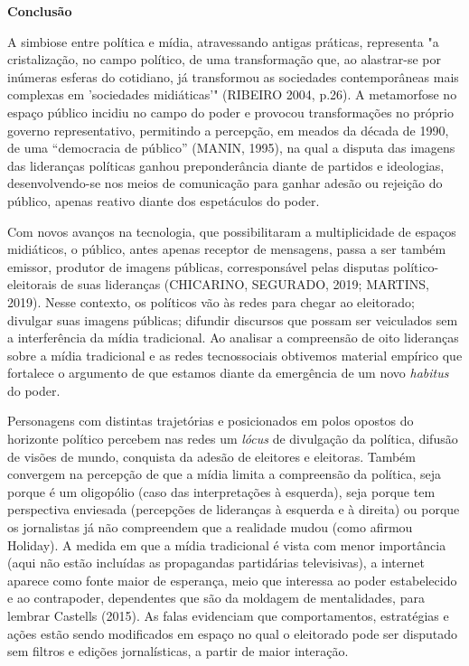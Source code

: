 \textbf{Conclusão}

A simbiose entre política e mídia, atravessando antigas práticas,
representa "a cristalização, no campo político, de uma transformação
que, ao alastrar-se por inúmeras esferas do cotidiano, já transformou as
sociedades contemporâneas mais complexas em 'sociedades midiáticas'"
(RIBEIRO 2004, p.26). A metamorfose no espaço público incidiu no campo
do poder e provocou transformações no próprio governo representativo,
permitindo a percepção, em meados da década de 1990, de uma ``democracia
de público'' (MANIN, 1995), na qual a disputa das imagens das lideranças
políticas ganhou preponderância diante de partidos e ideologias,
desenvolvendo-se nos meios de comunicação para ganhar adesão ou rejeição
do público, apenas reativo diante dos espetáculos do poder.

Com novos avanços na tecnologia, que possibilitaram a multiplicidade de
espaços midiáticos, o público, antes apenas receptor de mensagens, passa
a ser também emissor, produtor de imagens públicas, corresponsável pelas
disputas político-eleitorais de suas lideranças (CHICARINO, SEGURADO,
2019; MARTINS, 2019). Nesse contexto, os políticos vão às redes para
chegar ao eleitorado; divulgar suas imagens públicas; difundir discursos
que possam ser veiculados sem a interferência da mídia tradicional. Ao
analisar a compreensão de oito lideranças sobre a mídia tradicional e as
redes tecnossociais obtivemos material empírico que fortalece o
argumento de que estamos diante da emergência de um novo \emph{habitus}
do poder.

Personagens com distintas trajetórias e posicionados em polos opostos do
horizonte político percebem nas redes um \emph{lócus} de divulgação da
política, difusão de visões de mundo, conquista da adesão de eleitores e
eleitoras. Também convergem na percepção de que a mídia limita a
compreensão da política, seja porque é um oligopólio (caso das
interpretações à esquerda), seja porque tem perspectiva enviesada
(percepções de lideranças à esquerda e à direita) ou porque os
jornalistas já não compreendem que a realidade mudou (como afirmou
Holiday). A medida em que a mídia tradicional é vista com menor
importância (aqui não estão incluídas as propagandas partidárias
televisivas), a internet aparece como fonte maior de esperança, meio que
interessa ao poder estabelecido e ao contrapoder, dependentes que são da
moldagem de mentalidades, para lembrar Castells (2015). As falas
evidenciam que comportamentos, estratégias e ações estão sendo
modificados em espaço no qual o eleitorado pode ser disputado sem
filtros e edições jornalísticas, a partir de maior interação.

